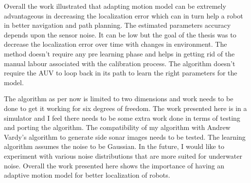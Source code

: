 \documentclass[12pt]{dalcsthesis}
\begin{document}
Overall the work illustrated that adapting motion model can be extremely advantageous in decreasing the localization error which can in turn help a robot in better navigation and path planning. The estimated parameters accuracy depends upon the sensor noise. It can be low but the goal of the thesis was to decrease the localization error over time with changes in environment. The method doesn't require any pre learning phase and helps in getting rid of the manual labour associated with the calibration process. The algorithm doesn't require the AUV to loop back in its path to learn the right parameters for the model.

The algorithm as per now is limited to two dimensions and work needs to be done to get it working for six degrees of freedom. The work presented here is in a simulator and I feel there needs to be some extra work done in terms of testing and porting the algorithm. The compatibility of my algorithm with Andrew Vardy's \cite{vandrish2011side} algorithm to generate side sonar images needs to be tested. The learning algorithm assumes the noise to be Gaussian. In the future, I would like to experiment with various noise distributions that are more suited for underwater noise. Overall the work presented here shows the importance of having an adaptive motion model for better localization of robots.   




\end{document}
